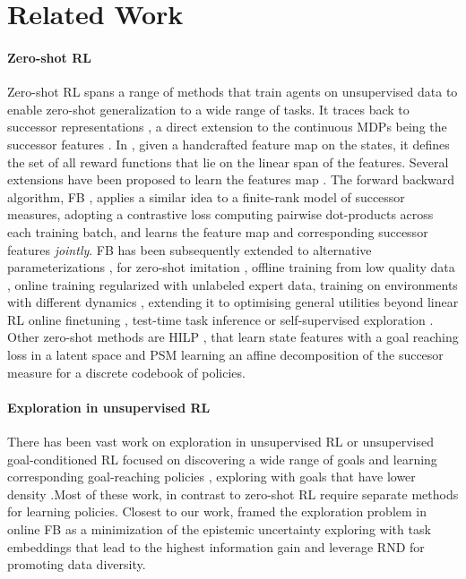 \section{Related Work}
\paragraph{Zero-shot RL} Zero-shot RL spans a range of methods that train agents on unsupervised data to enable zero-shot generalization to a wide range of tasks. It traces back to successor representations \citep{dayan1993improving}, a direct extension to the continuous MDPs being the successor features \citep{barreto2017successor}. In \citep{borsauniversal}, given a handcrafted feature map on the states, it defines the set of all reward functions that lie on the linear span of the features. Several extensions have been proposed to learn the features map \citep{hansen2019fast, laskin2021urlb}. The forward backward algorithm, FB \citep{touati2021learning, touati2023does}, applies a similar idea to a finite-rank model of successor measures, adopting a contrastive loss computing pairwise dot-products across each training batch, and learns the feature map and corresponding successor features \textit{jointly}. FB has been subsequently extended to alternative parameterizations \citep{bagatella2025td, cetin25}, for zero-shot imitation \citep{pirotta2024fast}, offline training from low quality data \citep{jeen2023zero}, online training regularized with unlabeled expert data\citep{tirinzoni2025zeroshot}, training on environments with different dynamics \citep{bobrin2025zero}, extending it to optimising general utilities beyond linear RL \citep{bagatella2026soft}  online finetuning \citep{sikchi_fast_2025}, test-time task inference \citep{rupf2025optimistic}  or self-supervised exploration \citep{urpiepistemically, fb-dual-value}.
Other zero-shot methods are HILP \citep{park2024foundation}, that learn state features with a goal reaching loss in a latent space and PSM \citep{agarwal2024proto} learning an affine decomposition of the succesor measure for a discrete codebook of policies.

\paragraph{Exploration in unsupervised RL}
There has been vast work on exploration in unsupervised RL \citep{diayn, rnd, emergentoffdads, park_metra_2024} or unsupervised goal-conditioned RL focused on discovering a wide range of goals and learning corresponding goal-reaching policies \citep{mendonca2021discovering,bagaria2019option}, exploring with goals that have lower density \citep{pitis2020maximum, Skew-Fit, diaz2025discover, florensa2018automatic}.Most of these work, in contrast to zero-shot RL require separate methods for learning policies. Closest to our work, \citet{urpiepistemically} framed the exploration problem in online FB as a minimization of the epistemic uncertainty exploring with task embeddings that lead to the highest information gain and \citet{fb-dual-value} leverage RND for promoting data diversity.
